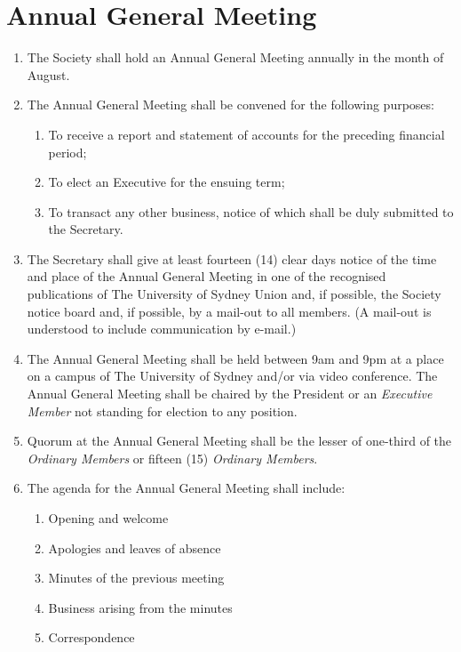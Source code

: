 \documentclass[11pt]{article}
\begin{document}
\section{Annual General Meeting}
\begin{enumerate}[\thesection .1]
    \item The Society shall hold an Annual General Meeting annually in the month of August.
    \item The Annual General Meeting shall be convened for the following purposes:
    \begin{enumerate}[\hspace{5mm}1.]
        \item To receive a report and statement of accounts for the preceding financial period;
        \item To elect an Executive for the ensuing term;
        \item To transact any other business, notice of which shall be duly submitted to the Secretary.
    \end{enumerate}
    \item The Secretary shall give at least fourteen (14) clear days notice of the time and place of the Annual General Meeting in one of the recognised publications of The University of Sydney Union and, if possible, the Society notice board and, if possible, by a mail-out to all members. (A mail-out is understood to include communication by e-mail.)
    \item The Annual General Meeting shall be held between 9am and 9pm at a place on a campus of The University of Sydney and/or via video conference. The Annual General Meeting shall be chaired by the President or an \textit{Executive Member} not standing for election to any position.
    \item Quorum at the Annual General Meeting shall be the lesser of one-third of the \textit{Ordinary Members} or fifteen (15) \textit{Ordinary Members}.
    \item The agenda for the Annual General Meeting shall include:
    \begin{enumerate}[\hspace{5mm}1.]
        \item Opening and welcome
    	\item Apologies and leaves of absence
    	\item Minutes of the previous meeting
    	\item Business arising from the minutes
    	\item Correspondence

\end{enumerate}
\end{enumerate}
\end{document}
